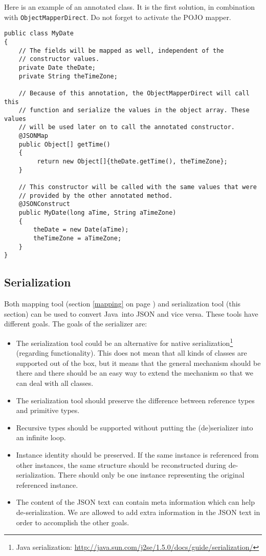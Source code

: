 \documentclass[a4paper]{article}
\newcommand{\java}{Java}
\begin{document}
Here is an example of an annotated class. It is the first solution, in combination with \lstinline{ObjectMapperDirect}. Do not forget to activate the POJO mapper.

\medskip
\begin{lstlisting}
public class MyDate
{
    // The fields will be mapped as well, independent of the 
    // constructor values.
    private Date theDate;
    private String theTimeZone;
    
    // Because of this annotation, the ObjectMapperDirect will call this 
    // function and serialize the values in the object array. These values 
    // will be used later on to call the annotated constructor. 
    @JSONMap   
    public Object[] getTime()
    {
         return new Object[]{theDate.getTime(), theTimeZone};
    }

    // This constructor will be called with the same values that were 
    // provided by the other annotated method.
    @JSONConstruct
    public MyDate(long aTime, String aTimeZone)
    {
        theDate = new Date(aTime);
        theTimeZone = aTimeZone;
    }        
}
\end{lstlisting}

\subsection{Serialization}
\label{serialization}

Both mapping tool (section \ref{mapping} on page \pageref{mapping})  and serialization tool (this section) can be used to convert \java\ into JSON and vice versa. These tools have different goals. The goals of the serializer are:

\begin{itemize}
	\item The serialization tool could be an alternative for native serialization\footnote{Java serialization: \url{http://java.sun.com/j2se/1.5.0/docs/guide/serialization/}} (regarding functionality). This does not mean that all kinds of classes are supported out of the box, but it means that the general mechanism should be there and there should be an easy way to extend the mechanism so that we can deal with all classes.
	\item The serialization tool should preserve the difference between reference types and primitive types.
	\item Recursive types should be supported without putting the (de)serializer into an infinite loop.
	\item Instance identity should be preserved. If the same instance is referenced from other instances, the same structure should be reconstructed during de-serialization. There should only be one instance representing the original referenced instance.
	\item The content of the JSON text can contain meta information which can help de-serialization. We are allowed to add extra information in the JSON text in order to accomplish the other goals.
\end{itemize}
\end{document}
